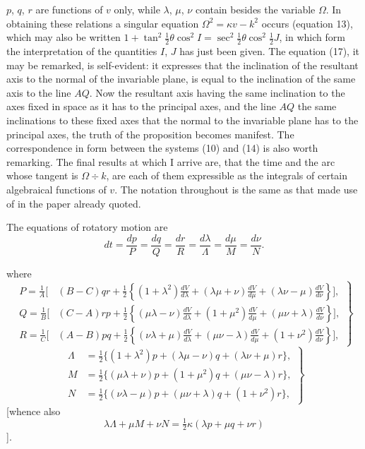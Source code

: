 \documentclass[11pt]{article}
\begin{document}
$p$, $q$, $r$ are functions of $v$ only, while $\lambda$, $\mu$, $\nu$ contain besides the
variable $\Omega$. In obtaining these relations a singular equation
$\Omega^2=\kappa v-k^2$ occurs (equation 13), which may also be written
$1+\tan^2\tfrac12\theta\cos^2 I=\sec^2\tfrac12\theta\cos^2\tfrac12 J$, in which form
the interpretation of the quantities $I$, $J$ has just been given. The equation (17),
it may be remarked, is self-evident: it expresses that the inclination of the resultant
axis to the normal of the invariable plane, is equal to the inclination of the same axis
to the line $AQ$. Now the resultant axis having the same inclination to the axes fixed
in space as it has to the principal axes, and the line $AQ$ the same inclinations to
these fixed axes that the normal to the invariable plane has to the principal axes, the
truth of the proposition becomes manifest. The correspondence in form between the
systems (10) and (14) is also worth remarking. The final results at which I arrive are,
that the time and the arc whose tangent is $\Omega\div k$, are each of them expressible
as the integrals of certain algebraical functions of $v$. The notation throughout is the
same as that made use of in the paper already quoted.

The equations of rotatory motion are
\[
dt=\frac{dp}{P}=\frac{dq}{Q}=\frac{dr}{R}
  =\frac{d\lambda}{\Lambda}=\frac{d\mu}{M}=\frac{d\nu}{N}.\tag{1}
\]

\newpage
\setcounter{page}{239}

where
\[
\left.
\begin{aligned}
P=\frac{1}{A}\biggl[&(B-C)qr+\frac12\left\{(1+\lambda^2)\frac{dV}{d\lambda}
      +(\lambda\mu+\nu)\frac{dV}{d\mu}
      +(\lambda\nu-\mu)\frac{dV}{d\nu}\right\}\biggr],\\
Q=\frac{1}{B}\biggl[&(C-A)rp+\frac12\left\{(\mu\lambda-\nu)\frac{dV}{d\lambda}
      +(1+\mu^2)\frac{dV}{d\mu}
      +(\mu\nu+\lambda)\frac{dV}{d\nu}\right\}\biggr],\\
R=\frac{1}{C}\biggl[&(A-B)pq+\frac12\left\{(\nu\lambda+\mu)\frac{dV}{d\lambda}
      +(\mu\nu-\lambda)\frac{dV}{d\mu}
      +(1+\nu^2)\frac{dV}{d\nu}\right\}\biggr],
\end{aligned}
\right\}\tag{2}
\]
\[
\left.
\begin{aligned}
\Lambda&=\frac12\{(1+\lambda^2)p+(\lambda\mu-\nu)q+(\lambda\nu+\mu)r\},\\
M&=\frac12\{(\mu\lambda+\nu)p+(1+\mu^2)q+(\mu\nu-\lambda)r\},\\
N&=\frac12\{(\nu\lambda-\mu)p+(\mu\nu+\lambda)q+(1+\nu^2)r\},
\end{aligned}
\right\}\tag{3}
\]
[whence also
\[
\lambda\Lambda+\mu M+\nu N=\tfrac12\kappa(\lambda p+\mu q+\nu r)\tag{3 bis}
\]
].
\end{document}
